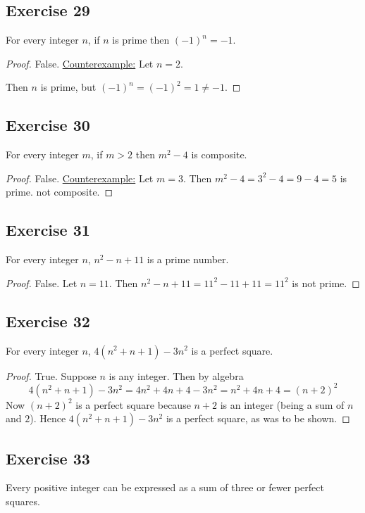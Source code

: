 \documentclass[14pt]{extarticle}
\begin{document}
\subsection{Exercise 29}
For every integer $n$, if $n$ is prime then $(-1)^n = -1$.

\begin{proof}
    False. \underline{Counterexample:} Let $n=2$.

    Then $n$ is prime, but $(-1)^n = (-1)^2 = 1 \neq -1$.
\end{proof}

\subsection{Exercise 30}
For every integer $m$, if $m > 2$ then $m^2 - 4$ is composite.

\begin{proof}
    False. \underline{Counterexample:} Let $m = 3$. Then $m^2 - 4 = 3^2 - 4 = 9 - 4 = 5$ is prime. not composite.
\end{proof}

\subsection{Exercise 31}
For every integer $n$, $n^2 - n + 11$ is a prime number.

\begin{proof}
    False. Let $n = 11$. Then $n^2 - n + 11 = 11^2 - 11 + 11 = 11^2$ is not prime.
\end{proof}

\subsection{Exercise 32}
For every integer $n$, $4(n^2 + n + 1) - 3n^2$ is a perfect square.

\begin{proof}
    True. Suppose $n$ is any integer. Then by algebra
    \[
        4(n^2 + n + 1) - 3n^2 = 4n^2 + 4n + 4 - 3n^2 = n^2 + 4n + 4 = (n + 2)^2
    \]
    Now $(n + 2)^2$ is a perfect square because $n + 2$ is an integer (being a sum of $n$ and $2$). Hence $4(n^2 + n + 1) - 3n^2$ is a perfect square, as was to be shown.
\end{proof}

\subsection{Exercise 33}
Every positive integer can be expressed as a sum of three or fewer perfect squares.
\end{document}
